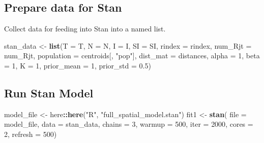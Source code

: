\documentclass[11pt,]{article}
\newenvironment{Shaded}{\begin{snugshade}}{\end{snugshade}}
\newcommand{\KeywordTok}[1]{\textcolor[rgb]{0.13,0.29,0.53}{\textbf{#1}}}
\newcommand{\DataTypeTok}[1]{\textcolor[rgb]{0.13,0.29,0.53}{#1}}
\newcommand{\DecValTok}[1]{\textcolor[rgb]{0.00,0.00,0.81}{#1}}
\newcommand{\FloatTok}[1]{\textcolor[rgb]{0.00,0.00,0.81}{#1}}
\newcommand{\StringTok}[1]{\textcolor[rgb]{0.31,0.60,0.02}{#1}}
\newcommand{\OperatorTok}[1]{\textcolor[rgb]{0.81,0.36,0.00}{\textbf{#1}}}
\newcommand{\NormalTok}[1]{#1}
\begin{document}
\subsection{Prepare data for Stan}\label{prepare-data-for-stan}

Collect data for feeding into Stan into a named list.

\begin{Shaded}
\begin{Highlighting}[]
\NormalTok{stan_data <-}\StringTok{ }\KeywordTok{list}\NormalTok{(}\DataTypeTok{T =}\NormalTok{ T, }\DataTypeTok{N =}\NormalTok{ N, }\DataTypeTok{I =}\NormalTok{ I, }\DataTypeTok{SI =}\NormalTok{ SI,}
                 \DataTypeTok{rindex     =}\NormalTok{ rindex,}
                 \DataTypeTok{num_Rjt    =}\NormalTok{ num_Rjt,}
                 \DataTypeTok{population =}\NormalTok{  centroids[, }\StringTok{"pop"}\NormalTok{],}
                 \DataTypeTok{dist_mat =}\NormalTok{ distances,}
                 \DataTypeTok{alpha =} \DecValTok{1}\NormalTok{,}
                 \DataTypeTok{beta =} \DecValTok{1}\NormalTok{,}
                 \DataTypeTok{K =} \DecValTok{1}\NormalTok{,}
                 \DataTypeTok{prior_mean =} \DecValTok{1}\NormalTok{,}
                 \DataTypeTok{prior_std =} \FloatTok{0.5}\NormalTok{)                  }
\end{Highlighting}
\end{Shaded}

\subsection{Run Stan Model}\label{run-stan-model}

\begin{Shaded}
\begin{Highlighting}[]
\NormalTok{model_file <-}\StringTok{ }\NormalTok{here}\OperatorTok{::}\KeywordTok{here}\NormalTok{(}\StringTok{"R"}\NormalTok{, }\StringTok{"full_spatial_model.stan"}\NormalTok{)}
\NormalTok{fit1 <-}\StringTok{ }\KeywordTok{stan}\NormalTok{(}
  \DataTypeTok{file =}\NormalTok{ model_file,  }
  \DataTypeTok{data =}\NormalTok{ stan_data,   }
  \DataTypeTok{chains =} \DecValTok{3}\NormalTok{,      }
  \DataTypeTok{warmup =} \DecValTok{500}\NormalTok{,     }
  \DataTypeTok{iter =} \DecValTok{2000}\NormalTok{,       }
  \DataTypeTok{cores =} \DecValTok{2}\NormalTok{,         }
  \DataTypeTok{refresh =} \DecValTok{500}\NormalTok{)     }
\end{Highlighting}
\end{Shaded}
\end{document}

